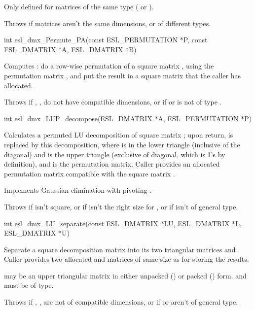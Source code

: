 \begin{sreapi}
Only defined for matrices of the same type (
or ).

Throws  if matrices aren't the same dimensions, or
of different types.


\hypertarget{func:esl_dmx_Permute_PA()}
{\item[int esl\_dmx\_Permute\_PA(const ESL\_PERMUTATION *P, const ESL\_DMATRIX *A, ESL\_DMATRIX *B)]}

Computes : do a row-wise permutation of a square
matrix , using the permutation matrix , and put
the result in a square matrix  that the caller has
allocated.

Throws  if , ,  do not have compatible dimensions,
or if  or  is not of type .


\hypertarget{func:esl_dmx_LUP_decompose()}
{\item[int esl\_dmx\_LUP\_decompose(ESL\_DMATRIX *A, ESL\_PERMUTATION *P)]}

Calculates a permuted LU decomposition of square matrix
; upon return,  is replaced by this decomposition,
where  is in the lower triangle (inclusive of the 
diagonal) and  is the upper triangle (exclusive of
diagonal, which is 1's by definition), and  is the
permutation matrix. Caller provides an allocated 
permutation matrix  compatible with the square matrix
.

Implements Gaussian elimination with pivoting 
\citep[p.~759]{Cormen99}.

Throws  if  isn't square, or if  isn't the right
size for , or if  isn't of general type.


\hypertarget{func:esl_dmx_LU_separate()}
{\item[int esl\_dmx\_LU\_separate(const ESL\_DMATRIX *LU, ESL\_DMATRIX *L, ESL\_DMATRIX *U)]}

Separate a square  decomposition matrix into its two
triangular matrices  and . Caller provides two
allocated  and  matrices of same size as  for
storing the results.

 may be an upper triangular matrix in either unpacked
() or packed () form.
 and  must be of  type.

Throws  if , ,  are not of compatible dimensions,
or if  or  aren't of general type. 



\end{sreapi}
